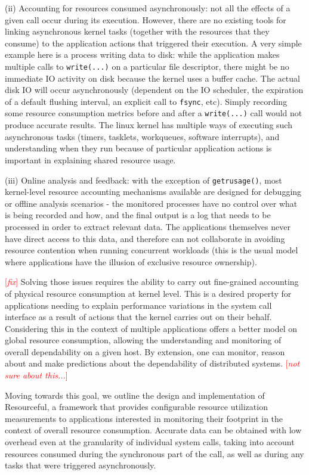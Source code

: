 \documentclass[letterpaper,twocolumn,10pt]{article}
\newcommand{\pname}{Resourceful}
\newcommand{\lnote}[1]{\textcolor{red}{[\textit{#1}]}} %
\begin{document}
(ii) Accounting for resources consumed asynchronously: not all the effects of a given call occur during its execution. However, there are no existing tools for linking asynchronous kernel tasks (together with the resources that they consume) to the application actions that triggered their execution. A very simple example here is a process writing data to disk: while the application makes multiple calls to \texttt{write(...)} on a particular file descriptor, there might be no immediate IO activity on disk because the kernel uses a buffer cache. The actual disk IO will occur asynchronously (dependent on the IO scheduler, the expiration of a default flushing interval, an explicit call to \texttt{fsync}, etc). Simply recording some resource consumption metrics before and after a \texttt{write(...)} call would not produce accurate results. The linux kernel has multiple ways of executing such asynchronous tasks (timers, tasklets, workqueues, software interrupts), and understanding when they run because of particular application actions is important in explaining shared resource usage.

(iii) Online analysis and feedback: with the exception of \texttt{getrusage()}, most kernel-level resource accounting mechanisms available are designed for debugging or offline analysis scenarios - the monitored processes have no control over what is being recorded and how, and the final output is a log that needs to be processed in order to extract relevant data. The applications themselves never have direct access to this data, and therefore can not collaborate in avoiding resource contention when running concurrent workloads (this is the usual model where applications have the illusion of exclusive resource ownership).

\lnote{fix} Solving those issues requires the ability to carry out fine-grained accounting of physical resource consumption at kernel level. This is a desired property for applications needing to explain performance variations in the system call interface as a result of actions that the kernel carries out on their behalf. Considering this in the context of multiple applications offers a better model on global resource consumption, allowing the understanding and monitoring of overall dependability on a given host. By extension, one can monitor, reason about and make predictions about the dependability of distributed systems. \lnote{not sure about this...} 

Moving towards this goal, we outline the design and implementation of \pname, a framework that provides configurable resource utilization measurements to applications interested in monitoring their footprint in the context of overall resource consumption. Accurate data can be obtained with low overhead even at the granularity of individual system calls, taking into account resources consumed during the synchronous part of the call, as well as during any tasks that were triggered asynchronously. 
\end{document}

